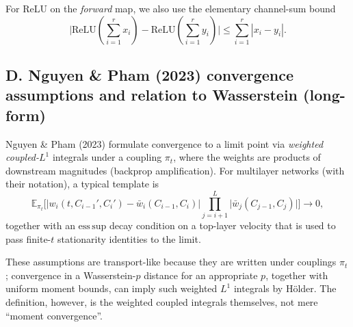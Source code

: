 \documentclass[11pt,a4paper]{article}
\newcommand{\NP}{Nguyen \& Pham (2023)}
\begin{document}
For ReLU on the \emph{forward} map, we also use the elementary channel-sum bound
\[
\big|\mathrm{ReLU}(\sum_{i=1}^r x_i)-\mathrm{ReLU}(\sum_{i=1}^r y_i)\big|
\le \sum_{i=1}^r |x_i-y_i|.
\]

\subsection*{D. \NP{} convergence assumptions and relation to Wasserstein (long-form)}

\NP{} formulate convergence to a limit point via \emph{weighted coupled-$L^1$} integrals under a coupling $\pi_t$, where the weights are products of downstream magnitudes (backprop amplification). For multilayer networks (with their notation), a typical template is
\[
\mathbb{E}_{\pi_t}\Big[\big|w_i(t,C_{i-1}',C_i')-\bar w_i(C_{i-1},C_i)\big|\prod_{j=i+1}^{L}\big|\bar w_j(C_{j-1},C_j)\big|\Big]\to 0,
\]
together with an $\mathrm{ess\,sup}$ decay condition on a top-layer velocity that is used to pass finite-$t$ stationarity identities to the limit.

These assumptions are transport-like because they are written under couplings $\pi_t$; convergence in a Wasserstein-$p$ distance for an appropriate $p$, together with uniform moment bounds, can imply such weighted $L^1$ integrals by Hölder. The definition, however, is the weighted coupled integrals themselves, not mere ``moment convergence''.
\end{document}
